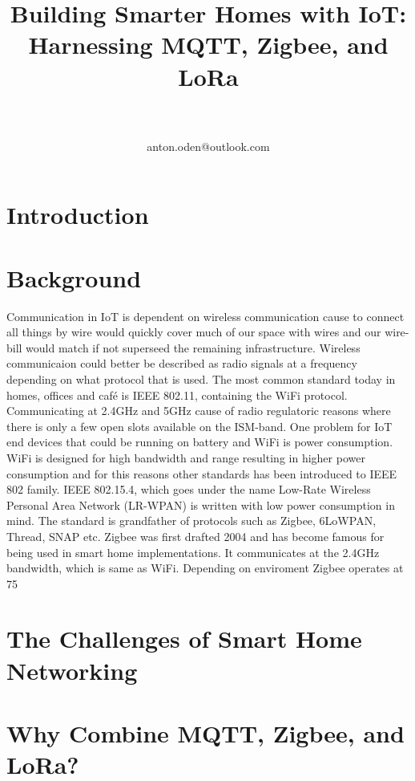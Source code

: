 \documentclass[article,a4paper]{IEEEtran}
\title{Building Smarter Homes with IoT: Harnessing MQTT, Zigbee, and LoRa}
\author{
\IEEEauthorblockN{Anton Odén}\\
\IEEEauthorblockA{Dept. of Maths and Computer Science\\Karlstad University\\
651 88 KARLSTAD, Sweden}\\
anton.oden@outlook.com
}
\begin{document}
\maketitle

    \begin{abstract}
        
    \end{abstract}

    \section{Introduction}

    \section{Background}
    Communication in IoT is dependent on wireless communication cause to connect all things by wire would quickly cover much of our space with wires and our wire-bill would match if not superseed the remaining infrastructure. Wireless communicaion could better be described as radio signals at a frequency depending on what protocol that is used. The most common standard today in homes, offices and café is IEEE 802.11, containing the WiFi protocol. Communicating at 2.4GHz and 5GHz cause of radio regulatoric reasons where there is only a few open slots available on the ISM-band. One problem for IoT end devices that could be running on battery and WiFi is power consumption. WiFi is designed for high bandwidth and range resulting in higher power consumption and for this reasons other standards has been introduced to IEEE 802 family. 
    \newline\newline
    IEEE 802.15.4, which goes under the name Low-Rate Wireless Personal Area Network (LR-WPAN) is written with low power consumption in mind. The standard is grandfather of protocols such as Zigbee, 6LoWPAN, Thread, SNAP etc. Zigbee was first drafted 2004 and has become famous for being used in smart home implementations. It communicates at the 2.4GHz bandwidth, which is same as WiFi. Depending on enviroment Zigbee operates at 75


    \section{The Challenges of Smart Home Networking}

    \section{Why Combine MQTT, Zigbee, and LoRa?}
\end{document}
